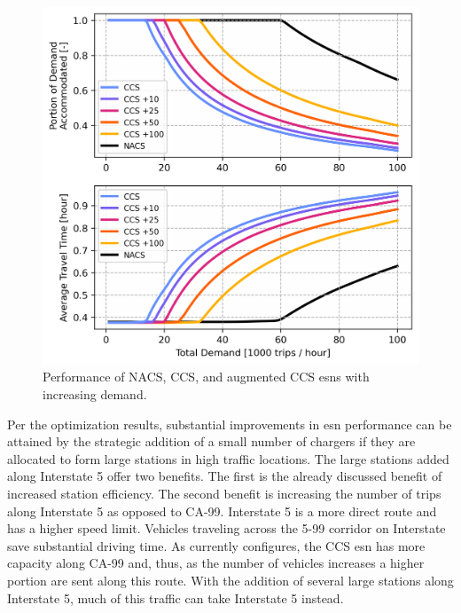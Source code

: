 \begin{figure}[H]
	\centering
	\includegraphics[width = \figurewidth]{./figures/augmented_esn_performance.png}
	\caption{Performance of NACS, CCS, and augmented CCS \glspl{esn} with increasing demand.}
	\label{fig:augmented_esn_performance}
\end{figure}

Per the optimization results, substantial improvements in \gls{esn} performance can be attained by the strategic addition of a small number of chargers if they are allocated to form large stations in high traffic locations. The large stations added along Interstate 5 offer two benefits. The first is the already discussed benefit of increased station efficiency. The second benefit is increasing the number of trips along Interstate 5 as opposed to CA-99. Interstate 5 is a more direct route and has a higher speed limit. Vehicles traveling across the 5-99 corridor on Interstate save substantial driving time. As currently configures, the CCS \gls{esn} has more capacity along CA-99 and, thus, as the number of vehicles increases a higher portion are sent along this route. With the addition of several large stations along Interstate 5, much of this traffic can take Interstate 5 instead.




